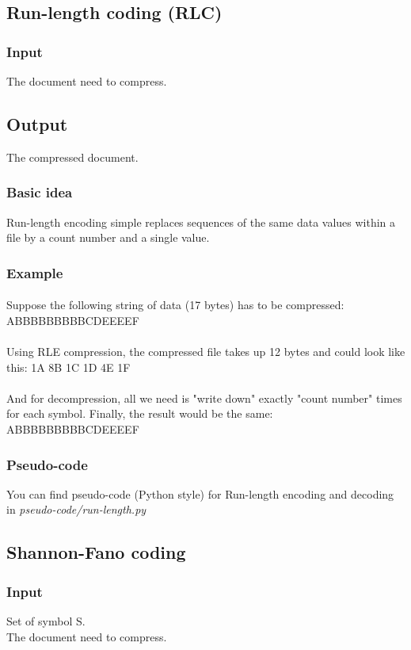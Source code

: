\subsection{Run-length coding (RLC)}
\subsubsection*{Input}
The document need to compress.
\subsection*{Output}
The compressed document.
\subsubsection*{Basic idea}
Run-length encoding simple replaces sequences of the same data values within a file by a count number and a single value.
\subsubsection*{Example}
\paragraph*{}
Suppose the following string of data (17 bytes) has to be compressed: ABBBBBBBBBCDEEEEF
\paragraph*{}
Using RLE compression, the compressed file takes up 12 bytes and could look like this: 1A 8B 1C 1D 4E 1F
\paragraph*{}
And for decompression, all we need is "write down" exactly "count number" times for each symbol. Finally, the result would be the same:\\
ABBBBBBBBBCDEEEEF
\subsubsection*{Pseudo-code}
You can find pseudo-code (Python style) for Run-length encoding and decoding in \textit{pseudo-code/run-length.py}
\subsection{Shannon-Fano coding}
\subsubsection*{Input}
Set of symbol S.\\
The document need to compress.
